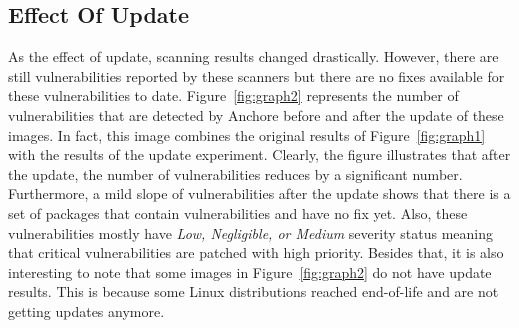 \documentclass[a4paper,num-refs]{oup-contemporary}
\begin{document}
\subsection{Effect Of Update}

As the effect of update,
scanning results changed drastically. However, there are still
vulnerabilities reported by these scanners but there are no fixes available for these vulnerabilities
to date.
Figure~\ref{fig:graph2} represents the number of vulnerabilities that are detected by Anchore before and after 
the update of these images. 
In fact, this image combines the original results of Figure~\ref{fig:graph1} with the results of the update
experiment.
Clearly, the figure illustrates that after the update, the number of vulnerabilities reduces by a
significant number. Furthermore, a mild slope of vulnerabilities after the update shows that
there is a set of packages that contain vulnerabilities and have no fix yet. Also, these
vulnerabilities mostly have \textit{Low, Negligible, or Medium} severity status meaning that
critical vulnerabilities are patched with high priority.
Besides that, it is also interesting to note that some images in Figure~\ref{fig:graph2}
do not have update results. This is because some Linux distributions reached end-of-life and
are not getting updates anymore.

\end{document}
